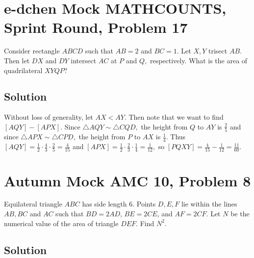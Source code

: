 \documentclass{article}
\begin{document}
\pagebreak\section{e-dchen Mock MATHCOUNTS, Sprint Round, Problem 17}
Consider rectangle $ABCD$ such that $AB=2$ and $BC=1.$ Let $X,Y$ trisect $AB.$ Then let $DX$ and $DY$ intersect $AC$ at $P$ and $Q,$ respectively. What is the area of quadrilateral $XYQP?$

\subsection{Solution}
Without loss of generality, let $AX<AY.$ Then note that we want to find $[AQY]-[APX].$ Since $\triangle AQY\sim \triangle CQD,$ the height from $Q$ to $AY$ is $\frac{2}{5}$ and since $\triangle APX\sim \triangle CPD,$ the height from $P$ to $AX$ is $\frac{1}{4}.$ Thus $[AQY]=\frac{1}{2}\cdot\frac{4}{3}\cdot\frac{2}{5}=\frac{4}{15}$ and $[APX]=\frac{1}{2}\cdot\frac{2}{3}\cdot\frac{1}{4}=\frac{1}{12},$ so $[PQXY]=\frac{4}{15}-\frac{1}{12}=\frac{11}{60}.$

\begin{center}
\end{center}

\pagebreak\section{Autumn Mock AMC 10, Problem 8}
Equilateral triangle $ABC$ has side length $6$. Points $D, E, F$ lie within the lines $AB, BC$ and $AC$ such that $BD=2AD$, $BE=2CE$, and $AF=2CF$. Let $N$ be the numerical value of the area of triangle $DEF$. Find $N^2$.

\subsection{Solution}
\end{document}
